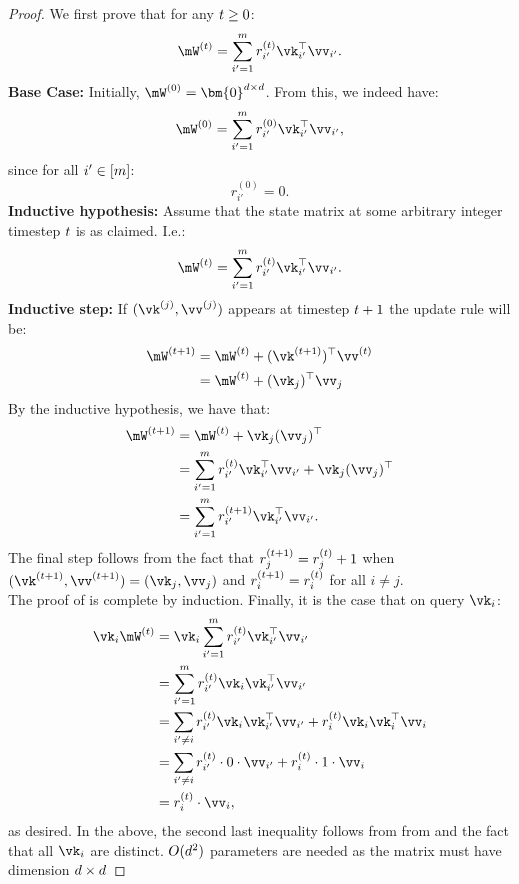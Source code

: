 \begin{proof}
    We first prove that for any $t\ge0$:
    \begin{equation}\label{eq:orthola} \state^{(\timestep)} = \sum_{i'=1}^{\numPairs} r_{i'}^{(t)} \vk_{i'}^{\top} \vv_{i'}.
    \end{equation}
    \textbf{Base Case:} Initially, $\mW^{(0)}=\bm{0}^{\modelDim\times\modelDim}$. From this, we indeed have:
    \[ \state^{(0)} = \sum_{i'=1}^{\numPairs} r_{i'}^{(0)} \vk_{i'}^{\top} \vv_{i'},\]
    since for all $i'\in[m]$:
    \[r_{i'}^{(0)} = 0.\]
    \textbf{Inductive hypothesis:} Assume that the state matrix at some arbitrary integer timestep $t$ is as claimed. I.e.:
    \[ \state^{(\timestep)} = \sum_{i'=1}^{\numPairs} r_{i'}^{(t)} \vk_{i'}^{\top} \vv_{i'}.\]
    \textbf{Inductive step:}
    If $\kvpair{j}$ appears at timestep $t+1$ the update rule will be:
    \begin{align*}\state^{(\timestep+1)} &=\state^{(\timestep)}+(\vk^{(\timestep+1)})^{\top}\vv^{(\timestep)} \\
    &= \state^{(\timestep)}+(\vk_{j})^{\top}\vv_{j}
    \end{align*}
    By the inductive hypothesis, we have that:
    \begin{align*}
        \state^{(\timestep+1)}
        &= \state^{(\timestep)}+\vk_{j}(\vv_{j})^{\top} \\
        &= \sum_{i'=1}^{\numPairs} r_{i'}^{(t)} \vk_{i'}^{\top} \vv_{i'}+\vk_{j}(\vv_{j})^{\top} \\
        &= \sum_{i'=1}^{\numPairs} r_{i'}^{(t+1)} \vk_{i'}^{\top} \vv_{i'}.
    \end{align*}
    The final step follows from the fact that $r_{j}^{(t+1)}= r_{j}^{(t)}+1$  when $\kvpair{\timestep+1}=(\vk_{j}, \vv_{j})$ and $r_{i}^{(t+1)}= r_{i}^{(t)}$ for all $i\neq j$.\\
    The proof of  is complete by induction.
    Finally, it is the case that on query $\vk_{i}$:
    \begin{align*}
        \vk_{i}\mW^{(\timestep)} &= \vk_{i}\sum_{i'=1}^{\numPairs} r_{i'}^{(t)} \vk_{i'}^{\top} \vv_{i'} \\
        &= \sum_{i'=1}^{\numPairs} r_{i'}^{(t)} \vk_{i}\vk_{i'}^{\top} \vv_{i'} \\
        &= \sum_{i'\neq i} r_{i'}^{(t)} \vk_{i}\vk_{i'}^{\top} \vv_{i'} +  r_{i}^{(t)} \vk_{i}\vk_{i}^{\top} \vv_{i}\\
        &= \sum_{i'\neq i} r_{i'}^{(t)}\cdot 0\cdot \vv_{i'} + r_{i}^{(t)}  \cdot 1 \cdot \vv_{i}\\
        &=   r_{i}^{(t)}\cdot\vv_{i},\\
    \end{align*}
    as desired. In the above, the second last inequality follows from from  and the fact that all $\vk_{i}$ are distinct.
    $O(d^{2})$ parameters are needed as the matrix must have dimension $d\times d$
\end{proof}
